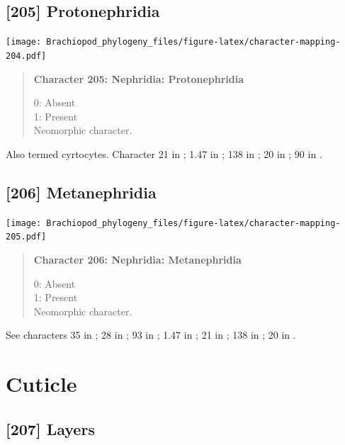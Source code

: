 \documentclass[openany]{book}
\begin{document}
\subsection*{{[}205{]} Protonephridia}\label{protonephridia}

\texttt{[image: Brachiopod\_phylogeny\_files/figure-latex/character-mapping-204.pdf]}

\begin{quote}
\textbf{Character 205: Nephridia: Protonephridia}

0: Absent\\
1: Present\\
Neomorphic character.
\end{quote}

Also termed cyrtocytes. Character 21 in \citet{Grobe2007}; 1.47 in
\citet{SPS1996}; 138 in \citet{Rouse1999}; 20 in \citet{Haszprunar1996};
90 in \citet{Glenner2004}.

\subsection*{{[}206{]} Metanephridia}\label{metanephridia}

\texttt{[image: Brachiopod\_phylogeny\_files/figure-latex/character-mapping-205.pdf]}

\begin{quote}
\textbf{Character 206: Nephridia: Metanephridia}

0: Absent\\
1: Present\\
Neomorphic character.
\end{quote}

See characters 35 in \citet{Rouse1999}; 28 in \citet{Haszprunar2000}; 93
in \citet{Glenner2004}; 1.47 in \citet{SPS1996}; 21 in
\citet{Grobe2007}; 138 in \citet{Rouse1999}; 20 in
\citet{Haszprunar1996}.

\section{Cuticle}\label{cuticle}

\subsection*{{[}207{]} Layers}\label{layers}
\end{document}
